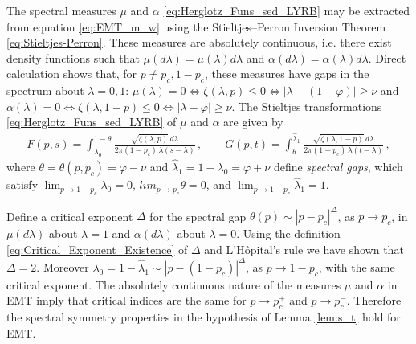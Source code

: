 \documentclass[english,12pt,jmp,graphicx]{revtex4-1}
\begin{document}
The spectral measures $\mu$ and $\alpha$ \eqref{eq:Herglotz_Funs_sed_LYRB}
may be extracted from equation \eqref{eq:EMT_m_w} using the Stieltjes--Perron
Inversion Theorem \eqref{eq:Stieltjes-Perron}. These measures are
absolutely continuous, i.e. there exist density functions such that
$\mu(d\lambda)=\mu(\lambda)d\lambda$ and $\alpha(d\lambda)=\alpha(\lambda)d\lambda$. Direct calculation shows
that, for $p\neq p_c,1-p_c$, these measures have gaps in the spectrum
about $\lambda=0,1$: $\mu(\lambda)=0\iff\zeta(\lambda,p)\leq0\iff|\lambda-(1-\varphi)|\geq\nu$ and
$\alpha(\lambda)=0\iff\zeta(\lambda,1-p)\leq0\iff|\lambda-\varphi|\geq\nu$.     
The Stieltjes transformations \eqref{eq:Herglotz_Funs_sed_LYRB} of $\mu$ and
$\alpha$ are given by 
%
\begin{align}\label{eq:EFM_Fs_Gt}
  F(p,s)%
      =\int_{\lambda_0}^{1-\theta}\frac{\sqrt{\zeta(\lambda,p)}\,d\lambda}{2\pi(1-p_c)\,\lambda(s-\lambda)}\,,
      \qquad 
  G(p,t)%
      =\int_{\theta}^{\hat{\lambda}_1}\frac{\sqrt{\zeta(\lambda,1-p)}\,d\lambda}{2\pi(1-p_c)\,\lambda(t-\lambda)}\,,
\end{align}
%
where $\theta=\theta(p,p_c)=\varphi-\nu$ and $\hat{\lambda}_1=1-\lambda_0=\varphi+\nu$ define \emph{spectral
  gaps}, which satisfy $\lim_{p\to1-p_c}\lambda_0=0$, $lim_{p\to p_c}\theta=0$,
and $\lim_{p\to1-p_c}\hat{\lambda}_1=1$. 

Define a critical exponent $\Delta$ for the spectral gap $\theta(p)\sim|p-p_c|^\Delta$,
as $p\to p_c$, in $\mu(d\lambda)$ about $\lambda=1$ and $\alpha(d\lambda)$ about $\lambda=0$. Using the
definition \eqref{eq:Critical_Exponent_Existence} of $\Delta$ and
L'H{\^o}pital's rule we have shown that $\Delta=2$. Moreover
$\lambda_0=1-\hat{\lambda}_1\sim|p-(1-p_c)|^\Delta$, as $p\to1-p_c$, with the same critical 
exponent.  The absolutely continuous nature of the measures
$\mu$ and $\alpha$ in EMT imply that critical indices are the same
for $p\to p_c^+$ and $p\to p_c^-$. Therefore the spectral symmetry
properties in the hypothesis of Lemma \ref{lem:s_t} hold for EMT. 
\end{document}
